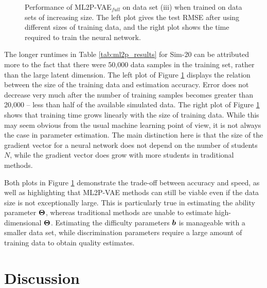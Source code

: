 \begin{figure}[h]
\begin{subfigure}{.47\textwidth}
    \end{subfigure}
    \caption{Performance of ML2P-VAE$_{full}$ on data set (iii) when trained on data sets of increasing size. The left plot gives the test RMSE after using different sizes of training data, and the right plot shows the time required to train the neural network.}
    \label{fig:train_size}
\end{figure}

The longer runtimes in Table \ref{tab:ml2p_results} for Sim-20 can be attributed more to the fact that there were 50,000 data samples in the training set, rather than the large latent dimension. The left plot of Figure \ref{fig:train_size} displays the relation between the size of the training data and estimation accuracy. Error does not decrease very much after the number of training samples becomes greater than 20,000 -- less than half of the available simulated data. The right plot of Figure \ref{fig:train_size} shows that training time grows linearly with the size of training data. While this may seem obvious from the usual machine learning point of view, it is not always the case in parameter estimation. The main distinction here is that the size of the gradient vector for a neural network does not depend on the number of students $N$, while the gradient vector does grow with more students in traditional methods.

Both plots in Figure \ref{fig:train_size} demonstrate the trade-off between accuracy and speed, as well as highlighting that ML2P-VAE methods can still be viable even if the data size is not exceptionally large. This is particularly true in estimating the ability parameter $\boldsymbol{\Theta}$, whereas traditional methods are unable to estimate high-dimensional $\boldsymbol{\Theta}$. Estimating the difficulty parameters $\boldsymbol{b}$ is manageable with a smaller data set, while discrimination parameters require a large amount of training data to obtain quality estimates.


\section{Discussion}
